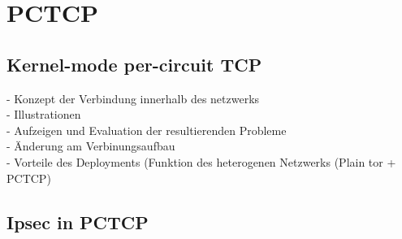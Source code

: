 \section{PCTCP}

\subsection{Kernel-mode per-circuit TCP}

- Konzept der Verbindung innerhalb des netzwerks\\
- Illustrationen\\
- Aufzeigen und Evaluation der resultierenden Probleme\\
- Änderung am Verbinungsaufbau\\
- Vorteile des Deployments (Funktion des heterogenen Netzwerks (Plain tor + PCTCP)\\

\subsection{Ipsec in PCTCP}


